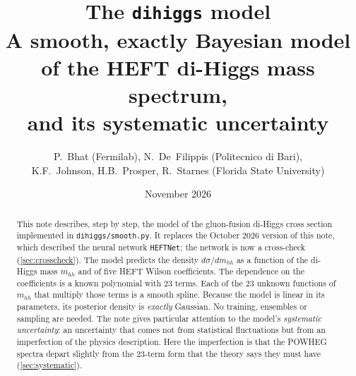 \documentclass[11pt]{article}
\title{\textbf{The \texttt{dihiggs} model}\\[4pt]
\large A smooth, exactly Bayesian model of the HEFT di-Higgs mass spectrum,\\
and its systematic uncertainty}
\author{P.~Bhat (Fermilab), N.~De~Filippis (Politecnico di Bari),\\
K.F.~Johnson, H.B.~Prosper, R.~Starnes (Florida State University)}
\date{November 2026}
\newcommand{\mhh}{m_{hh}}
\newcommand{\code}[1]{\texttt{#1}}
\begin{document}
\maketitle

\begin{abstract}
\noindent
This note describes, step by step, the model of the gluon-fusion di-Higgs cross section
implemented in \code{dihiggs/smooth.py}. It replaces the October 2026 version of this note,
which described the neural network \code{HEFTNet}; the network is now a cross-check
(\cref{sec:crosscheck}). The model predicts the density $d\sigma/d\mhh$ as a function of
the di-Higgs mass $\mhh$ and of five HEFT Wilson coefficients. The dependence on the
coefficients is a known polynomial with 23 terms. Each of the 23 unknown functions of $\mhh$
that multiply those terms is a smooth spline. Because the model is linear in its parameters,
its posterior density is \emph{exactly} Gaussian. No training, ensembles or sampling are
needed. The note gives particular attention to the model's \emph{systematic uncertainty}: an
uncertainty that comes not from statistical fluctuations but from an imperfection of the
physics description. Here the imperfection is that the POWHEG spectra depart slightly from
the 23-term form that the theory says they must have
(\cref{sec:systematic}).
\end{abstract}
\end{document}
